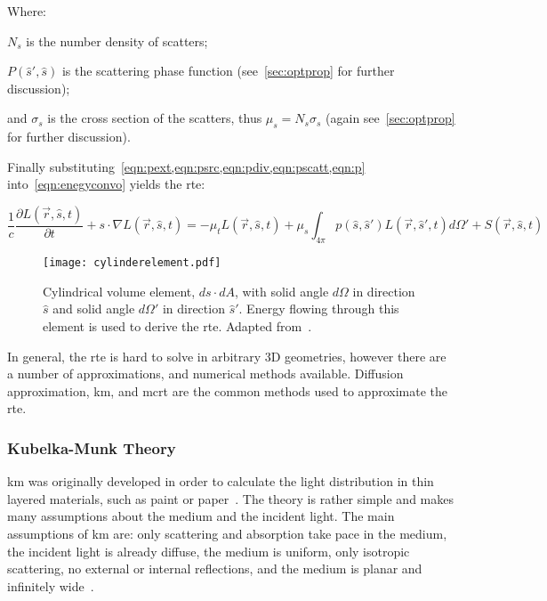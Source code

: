 \noindent Where:

\indent $N_s$ is the number density of scatters;

\indent $P(\hat{s}',\hat{s})$ is the scattering phase function (see~\cref{sec:optprop} for further discussion);

\indent and $\sigma_s$ is the cross section of the scatters, thus $\mu_s=N_s\sigma_s$ (again see~\cref{sec:optprop} for further discussion).

\medskip


Finally substituting~\cref{eqn:pext,eqn:psrc,eqn:pdiv,eqn:pscatt,eqn:p} into~\cref{eqn:enegyconvo} yields the \gls{rte}:

\begin{equation}
\frac{1}{c}\frac{\partial L(\vec{r},\hat{s},t)}{\partial t} + s\cdot \nabla L(\vec{r},\hat{s},t)=-\mu_tL(\vec{r},\hat{s},t)+\mu_s\int_{4\pi}p(\hat{s},\hat{s}')L(\vec{r},\hat{s}',t)d\Omega' + S(\vec{r},\hat{s},t)
\label{eqn:rte}
\end{equation}

\begin{figure}[!htb]
	\centering
	\texttt{[image: cylinderelement.pdf]}
	\caption{Cylindrical volume element, $ds \cdot dA$, with solid angle $d\Omega$ in direction $\hat{s}$ and solid angle $d\Omega'$ in direction $\hat{s}'$. Energy flowing through this element is used to derive the \gls{rte}. Adapted from~\cite{wang2012biomedical,chandrasekhar2013radiative}.}
	\label{fig:energydiag2}
\end{figure}

In general, the \gls{rte} is hard to solve in arbitrary 3D geometries, however there are a number of approximations, and numerical methods available. Diffusion approximation, \gls{km}, and \gls{mcrt} are the common methods used to approximate the \gls{rte}.

\subsubsection*{Kubelka-Munk Theory}
\gls{km} was originally developed in order to calculate the light distribution in thin layered materials, such as paint or paper~\cite{barbaric2011kubelka}. The theory is rather simple and makes many assumptions about the medium and the incident light. The main assumptions of \gls{km} are: only scattering and absorption take pace in the medium, the incident light is already diffuse, the medium is uniform, only isotropic scattering, no external or internal reflections, and the medium is planar and infinitely wide~\cite{jasinski2011modelling,cheong1990review,gabriela2013mathematical}.

